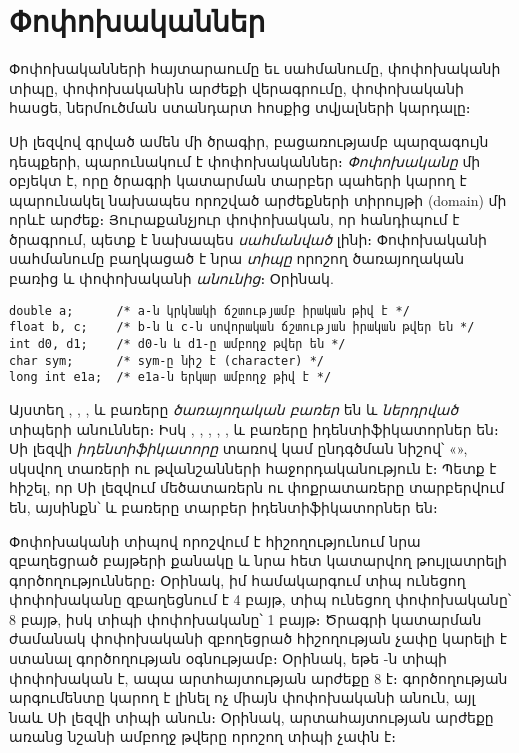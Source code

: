 \chapter{Փոփոխականներ}

\begin{epigraph}
Փոփոխականների հայտարաումը եւ սահմանումը, փոփոխականի
տիպը, փոփոխականին արժեքի վերագրումը, փոփոխականի հասցե,
ներմուծման ստանդարտ հոսքից տվյալների կարդալը։
\end{epigraph}

Սի լեզվով գրված ամեն մի ծրագիր, բացառությամբ պարզագույն դեպքերի,
պարունակում է փոփոխականներ։ \emph{Փոփոխականը}
մի օբյեկտ է, որը ծրագրի կատարման տարբեր պահերի կարող է պարունակել
նախապես որոշված ար\-ժեքների տիրույթի (domain) մի որևէ արժեք։
Յուրաքանչյուր փոփոխական, որ հանդիպում է ծրագրում, պետք է նախապես
\emph{սահմանված} լինի։ Փոփոխականի
սահմանումը բաղկացած է նրա \emph{տիպը} որոշող
ծառայողական բառից և փոփո\-խականի \emph{անունից}։
Օրինակ.

\begin{Verbatim}
double a;      /* a-ն կրկնակի ճշտությամբ իրական թիվ է */
float b, c;    /* b-ն և c-ն սովորական ճշտության իրական թվեր են */
int d0, d1;    /* d0-ն և d1-ը ամբողջ թվեր են */
char sym;      /* sym-ը նիշ է (character) */
long int e1a;  /* e1a-ն երկար ամբողջ թիվ է */
\end{Verbatim}

Այստեղ , , ,  և
 բառերը \emph{ծառայողական բառեր} են և \emph{ներդրված}
տիպերի անուններ։ Իսկ , , , ,
,  և  բառերը իդենտիֆիկատորներ են։
Սի լեզվի \emph{իդենտիֆիկատորը} տառով կամ ընդգծման նիշով՝
«\code{\_}», սկսվող տառերի ու թվանշանների հաջորդականություն է։
Պետք է հիշել, որ Սի լեզվում մեծատառերն ու փոքրատառերը տարբերվում
են, այսինքն՝  և  բառերը տարբեր
իդենտիֆիկատորներ են։

Փոփոխականի տիպով որոշվում է հիշողությունում նրա զբաղեցրած բայթերի
քանակը և նրա հետ կատարվող թույլատրելի գործողությունները։ Օրինակ, իմ
համակարգում  տիպ ունեցող փոփոխականը զբաղեցնում է 4 բայթ,
 տիպ ունեցող փոփոխականը՝ 8 բայթ, իսկ  տիպի
փոփոխականը՝ 1 բայթ։ Ծրագրի կատարման ժամանակ փոփոխականի զբողեցրած
հիշողության չափը կարելի է ստանալ  գործողության օգնությամբ։
Օրինակ, եթե -ն  տիպի փոփոխական է, ապա
 արտհայտության արժեքը 8 է։ 
գործողության արգումենտը կարող է լինել ոչ միայն փոփոխականի անուն,
այլ նաև Սի լեզվի տիպի անուն։ Օրինակ, 
արտահայտութ\-յան արժեքը առանց նշանի ամբողջ թվերը որոշող տիպի չափն է։

